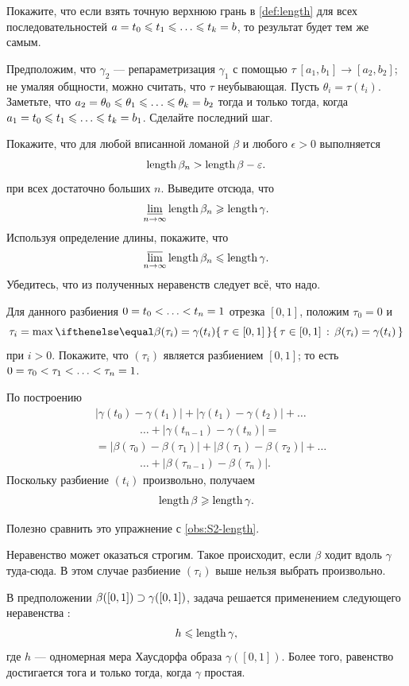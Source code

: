 \begin{multicols}{2}
\setcounter{eqtn}{0}

Покажите, что если взять точную верхнюю грань в \ref{def:length} для всех последовательностей
$a=t_0\le t_1\le\z\dots\le t_k=b$, то результат будет тем же самым.

Предположим, что $\gamma_2$ --- репараметризация $\gamma_1$ с помощью $\tau\:[a_1,b_1]\to [a_2,b_2]$; не умаляя общности, можно считать, что $\tau$ неубывающая.
Пусть $\theta_i=\tau(t_i)$.
Заметьте, что $a_2=\theta_0\z\le\theta_1\le \z\dots\le\theta_k=b_2$ тогда и только тогда, когда 
$a_1=t_0\le t_1\le\z\dots\le t_k=b_1$.
Сделайте последний шаг.

Покажите, что для любой вписанной ломаной $\beta$ и любого $\epsilon>0$ выполняется
\[\mathop{\rm length}\nolimits\beta_n>\mathop{\rm length}\nolimits\beta-\varepsilon.\]
при всех достаточно больших $n$.
Выведите отсюда, что
\[\varliminf_{n\to\infty}\mathop{\rm length}\nolimits\beta_n\geqslant \mathop{\rm length}\nolimits \gamma.\]
Используя определение длины, покажите, что 
\[\varlimsup_{n\to\infty}\mathop{\rm length}\nolimits\beta_n\leqslant \mathop{\rm length}\nolimits \gamma.\]
Убедитесь, что из полученных неравенств следует всё, что надо.

Для данного разбиения $0=t_0<\z\dots <t_n\z=1$ отрезка $[0,1]$, положим $\tau_0=0$ и 
\[\tau_i=\max\set{\tau \in[0,1]}{\beta(\tau_i)=\gamma(t_i)}\]
при $i>0$.
Покажите, что $(\tau_i)$ является разбиением $[0,1]$;
то есть $0=\tau_0<\tau_1<\z\dots<\tau_n=1$.

По построению 
\begin{align*}
&|\gamma(t_0)-\gamma(t_1)|+|\gamma(t_1)-\gamma(t_2)|+\dots
\\
&\qquad\qquad\dots+|\gamma(t_{n-1})-\gamma(t_n)|=
\\
&=
|\beta(\tau_0)-\beta(\tau_1)|+|\beta(\tau_1)-\beta(\tau_2)|+\dots
\\
&\qquad\qquad\dots+|\beta(\tau_{n-1})-\beta(\tau_n)|.
\end{align*}
Поскольку разбиение $(t_i)$ произвольно, получаем 
\[\mathop{\rm length}\nolimits \beta\geqslant \mathop{\rm length}\nolimits \gamma.\]

Полезно сравнить это упражнение с \ref{obs:S2-length}.

Неравенство может оказаться строгим.
Такое происходит, если $\beta$ ходит вдоль $\gamma$ туда-сюда.
В этом случае разбиение $(\tau_i)$ выше нельзя выбрать произвольно.

В предположении $\beta([0,1])\z\supset\gamma([0,1])$, задача решается применением следующего неравенства \cite[2.6.1+2.6.2]{burago-burago-ivanov}:
\[h\leqslant \mathop{\rm length}\nolimits\gamma,\] где $h$ --- одномерная мера Хаусдорфа образа $\gamma([0,1])$.
Более того, равенство достигается тога и только тогда, когда $\gamma$ простая.


\end{multicols}
